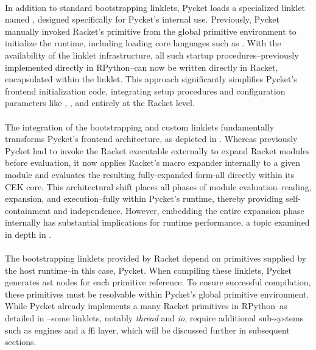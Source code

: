 
		\paragraph{}%
			In addition to standard bootstrapping linklets, Pycket loads a specialized linklet named , designed specifically for Pycket's internal use. Previously, Pycket manually invoked Racket’s  primitive from the global primitive environment to initialize the runtime, including loading core languages such as . With the availability of the linklet infrastructure, all such startup procedures--previously implemented directly in RPython--can now be written directly in Racket, encapsulated within the  linklet. This approach significantly simplifies Pycket’s frontend initialization code, integrating setup procedures and configuration parameters like , , and  entirely at the Racket level.


		\paragraph{}%
			The integration of the bootstrapping and custom linklets fundamentally transforms Pycket's frontend architecture, as depicted in . Whereas previously Pycket had to invoke the Racket executable externally to expand Racket modules before evaluation, it now applies Racket's macro expander internally to a given module and evaluates the resulting fully-expanded form-all directly within its CEK core. This architectural shift places all phases of module evaluation--reading, expansion, and execution--fully within Pycket’s runtime, thereby providing self-containment and independence. However, embedding the entire expansion phase internally has substantial implications for runtime performance, a topic examined in depth in .

		\paragraph{}%
			The bootstrapping linklets provided by Racket depend on primitives supplied by the host runtime--in this case, Pycket. When compiling these linklets, Pycket generates \gls{ast} nodes for each primitive reference. To ensure successful compilation, these primitives must be resolvable within Pycket's global primitive environment. While Pycket already implements a many Racket primitives in RPython--as detailed in --some linklets, notably \emph{thread} and \emph{io}, require additional sub-systems such as engines and a \gls{ffi} layer, which will be discussed further in subsequent sections.

